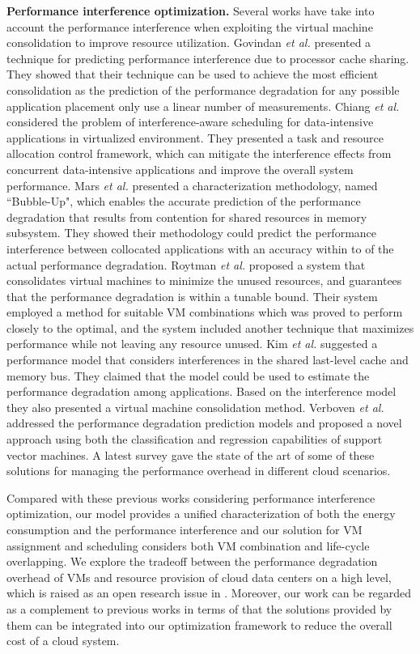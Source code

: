 \documentclass[10pt,journal]{IEEEtran}
\begin{document}
\textbf{Performance interference optimization.} 
Several works  \cite{Govindan11, Chiang11, Mars11, Roytman13, Kim13, Verboven13, Xu14} have take into account the performance interference when exploiting the virtual machine consolidation to improve resource utilization. Govindan \emph{et al.} \cite{Govindan11} presented a technique for predicting performance interference due to processor cache sharing. They showed that their technique can be used to achieve the most efficient consolidation as the prediction of the performance degradation for any possible application placement only use a linear number of measurements. Chiang \emph{et al.} \cite{Chiang11} considered the problem of interference-aware scheduling for data-intensive applications in virtualized environment. They presented a task and resource allocation control framework, which can mitigate the interference effects from concurrent data-intensive applications and improve the overall system performance. Mars \emph{et al.} \cite{Mars11} presented a characterization methodology, named ``Bubble-Up", which enables the accurate prediction of the performance degradation that results from contention for shared resources in memory subsystem. They showed their methodology could predict the performance interference between collocated applications with an accuracy within  to  of the actual performance degradation. Roytman \emph{et al.} \cite{Roytman13} proposed a system that consolidates virtual machines to minimize the unused resources, and guarantees that the performance degradation is within a tunable bound. Their system employed a method for suitable VM combinations which was proved to perform closely to the optimal, and the system included another technique that maximizes performance while not leaving any resource unused. Kim \emph{et al.} \cite{Kim13} suggested a performance model that considers interferences in the shared last-level cache and memory bus. They claimed that the model could be used to estimate the performance degradation among applications. Based on the interference model they also presented a virtual machine consolidation method. Verboven \emph{et al.} \cite{Verboven13} addressed the performance degradation prediction models and proposed a novel approach using both the classification and regression capabilities of support vector machines. A latest survey \cite{Xu14} gave the state of the art of some of these solutions for managing the performance overhead in different cloud scenarios.

Compared with these previous works considering performance interference optimization, our model provides a unified characterization of both the energy consumption and the performance interference and our solution for VM assignment and scheduling considers both VM combination and life-cycle overlapping. We explore the tradeoff between the performance degradation overhead of VMs and resource provision of cloud data centers on a high level, which is raised as an open research issue in \cite{Esch14}. Moreover, our work can be regarded as a complement to previous works in terms of that the solutions provided by them can be integrated into our optimization framework to reduce the overall cost of a cloud system.
\end{document}
